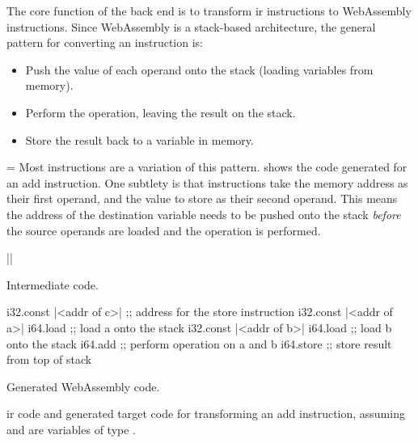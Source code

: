 \documentclass[00-main.tex]{subfiles}
\begin{document}
\par\nobreak\vfil{}\vfilneg %
   \vtop\bgroup %
The core function of the back end is to transform \gls{ir} instructions to WebAssembly instructions.
Since WebAssembly is a stack-based architecture, the general pattern for converting an instruction is:
\begin{itemize}[nosep]
\item Push the value of each operand onto the stack (loading variables from memory).
\item Perform the operation, leaving the result on the stack.
\item Store the result back to a variable in memory.
\end{itemize}
\par\xdef\tpd{\the\prevdepth}\egroup %
   \prevdepth=\tpd %
Most instructions are a variation of this pattern.
 shows the code generated for an add instruction.
One subtlety is that  instructions take the memory address as their first operand, and the value to store as their second operand.
This means the address of the destination variable needs to be pushed onto the stack \emph{before} the source operands are loaded and the operation is performed.

\begin{listing}[t]
  \begin{sublisting}[b]{0.28\textwidth}
    \begin{TextListing}
      ||
    \end{TextListing}
    \caption{Intermediate code.}
  \end{sublisting}
  \hfill
  \begin{sublisting}[b]{0.7\textwidth}
    \begin{WasmListing}
      i32.const |<addr of c>|  ;; address for the store instruction
      i32.const |<addr of a>|
      i64.load               ;; load a onto the stack
      i32.const |<addr of b>|
      i64.load               ;; load b onto the stack
      i64.add                ;; perform operation on a and b
      i64.store              ;; store result from top of stack
    \end{WasmListing}
    \caption{Generated WebAssembly code.}
  \end{sublisting}
  \caption{\Gls{ir} code and generated target code for transforming an add instruction, assuming  and  are variables of type .}
  \label{lst:converting add instr to wasm code}
\end{listing}
\end{document}
